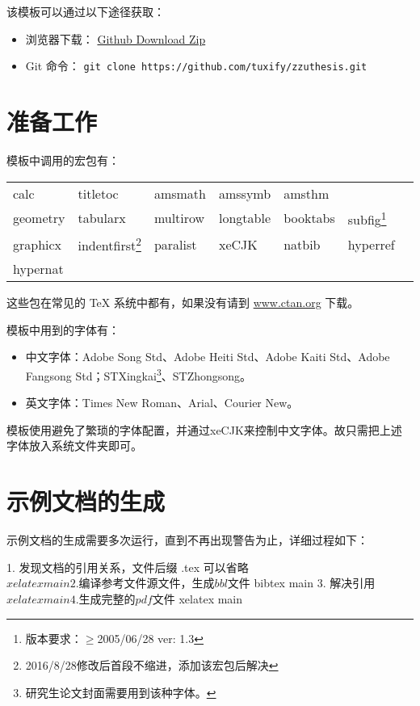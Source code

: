该模板可以通过以下途径获取：
\begin{itemize}
\item 浏览器下载：
\href{https://codeload.github.com/tuxify/zzuthesis/zip/master}{Github Download Zip}
\item Git 命令：
\texttt{git clone https://github.com/tuxify/zzuthesis.git}
\end{itemize}

\section{准备工作}

模板中调用的宏包有：
\begin{center}
\begin{minipage}{1.0\linewidth}\centering
\begin{tabular}{*{7}{l}}\hline
calc & titletoc & amsmath & amssymb & amsthm & \\%
geometry & tabularx & multirow & longtable & booktabs & subfig\footnote{版本要求：$\geq$2005/06/28 ver: 1.3} \\
graphicx & indentfirst\footnote{2016/8/28修改后首段不缩进，添加该宏包后解决} & paralist & xeCJK & natbib & hyperref \\
hypernat & & & & &\\\hline
\end{tabular}
\end{minipage}
\end{center}

这些包在常见的 \TeX{} 系统中都有，如果没有请到 \url{www.ctan.org} 下载。

模板中用到的字体有：
\begin{itemize}
\item 中文字体：Adobe Song Std、Adobe Heiti Std、Adobe Kaiti Std、Adobe Fangsong
Std；STXingkai\footnote{研究生论文封面需要用到该种字体。}、STZhongsong。
\item 英文字体：Times New Roman、Arial、Courier New。
\end{itemize}

模板使用\XeTeX{}避免了繁琐的字体配置，并通过xeCJK来控制中文字体。故只需把上述
字体放入系统文件夹即可。

\section{示例文档的生成}

示例文档的生成需要多次运行\XeLaTeX{}，直到不再出现警告为止，详细过程如下：
\begin{code}
1. 发现文档的引用关系，文件后缀 .tex 可以省略
$ xelatex main
2. 编译参考文件源文件，生成 bbl 文件
$ bibtex main
3. 解决引用
$ xelatex main
4. 生成完整的 pdf 文件
$ xelatex main
\end{code}

